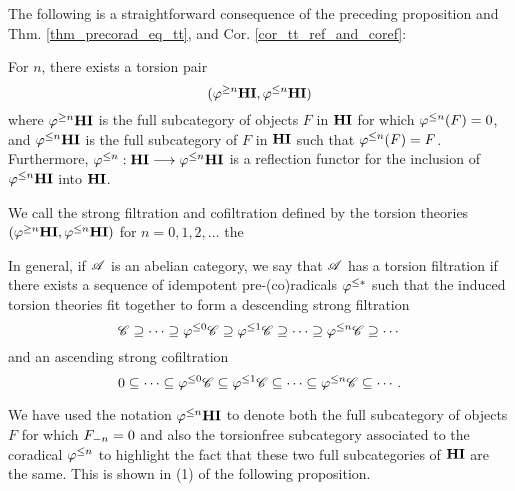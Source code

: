 The following is a straightforward consequence of the preceding 
proposition and Thm. \ref{thm_precorad_eq_tt}, and Cor. 
\ref{cor_tt_ref_and_coref}:

\begin{cor}\label{cor_tlHI_prop}
For $n$, there exists a torsion pair 
\[
(\tgHI{n}\HI, \tlHI{n}\HI)
\] 
where $\tgHI{n}\HI$ is the full subcategory of objects $F$ in 
$\HI$ for which $\tlHI{n}(F) = 0$, and $\tlHI{n}\HI$ is the full 
subcategory of $F$ in $\HI$ such that $\tlHI{n}(F) = F$. 
Furthermore, $\tlHI{n} : \HI \to \tlHI{n}\HI$ is a reflection 
functor for the inclusion of $\tlHI{n} \HI$ into $\HI$.
\end{cor}

\begin{defn}
We call the strong filtration and cofiltration defined by
the torsion theories $(\tgHI{n}\HI, \tlHI{n}\HI)$ for $n = 
0,1,2,\dots$ the 

In general, if $\Cat{A}$ is an abelian category, we say that
$\Cat{A}$ has a torsion filtration if there exists a sequence
of idempotent pre-(co)radicals $\corad{*}$ such that the induced
torsion theories fit together to form a descending strong 
filtration
\[
\Cat{C} \supseteq \cdots \supseteq \corad{0}\Cat{C} \supseteq
   \corad{1}\Cat{C} \supseteq \cdots \supseteq \corad{n}\Cat{C} 
   \supseteq \cdots
\]
and an ascending strong cofiltration
\[
0 \subseteq \cdots \subseteq \corad{0}\Cat{C} \subseteq
   \corad{1}\Cat{C} \subseteq \cdots \subseteq \corad{n}\Cat{C} 
   \subseteq \cdots.
\]
\end{defn}

\begin{rmk}
We have used the notation $\tlHI{n}\HI$ to denote both the full
subcategory of objects $F$ for which $\RHI[n]{F} = 0$ and also
the torsionfree subcategory associated to the coradical $\tlHI{n}$
to highlight the fact that these two full subcategories of $\HI$
are the same. This is shown in (1) of the following proposition.
\end{rmk}

